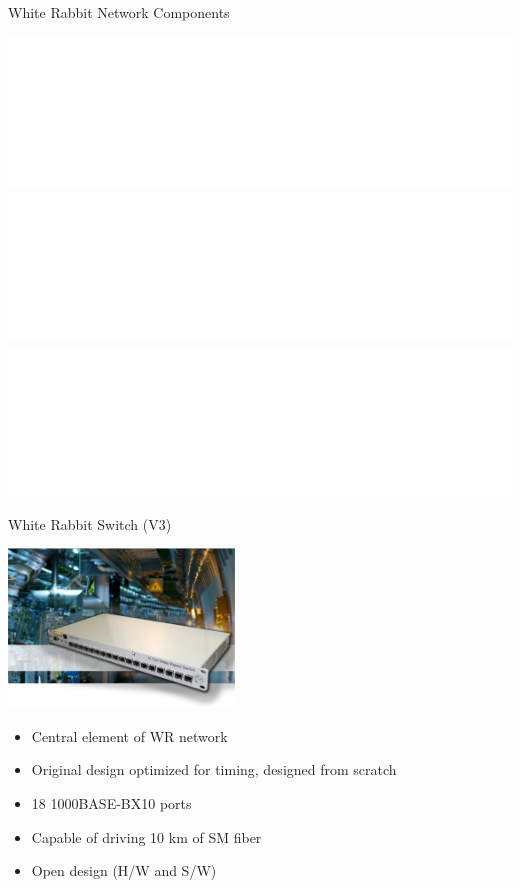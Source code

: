 \documentclass[compress,red]{beamer}
\begin{document}
\subsection{}
\begin{frame}{White Rabbit Network Components}


    \begin{center}
    \includegraphics<1>[width=1.0\textwidth]{network/WRnetwork-eva.pdf}  \pause
    \includegraphics<2>[width=1.0\textwidth]{network/WRNcomponents-1.pdf} \pause
    \includegraphics<3>[width=1.0\textwidth]{network/WRNcomponents-2.pdf}
    \end{center}

\end{frame}
\begin{frame}{White Rabbit Switch (V3)}

    \begin{center}
    \includegraphics[width=6.0cm]{switch/wrSwitchV3.jpg}
    \end{center}

	\begin{itemize}
	\item Central element of WR network
	\item Original design optimized for timing, designed from scratch
	\item 18 1000BASE-BX10 ports
	\item Capable of driving 10 km of SM fiber
	\item Open design (H/W and S/W)
	\end{itemize}

\end{frame}
\end{document}
